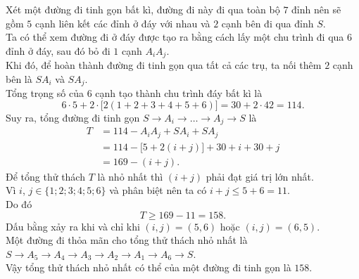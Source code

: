 \begin{ex}
{\begin{center}
		\end{center}
		Xét một đường đi tinh gọn bất kì, đường đi này đi qua toàn bộ $7$ đỉnh nên sẽ gồm $5$ cạnh liên kết các đỉnh ở đáy với nhau và $2$ cạnh bên đi qua đỉnh $S$.\\
		Ta có thể xem đường đi ở đáy được tạo ra bằng cách lấy một chu trình đi qua $6$ đỉnh ở đáy, sau đó bỏ đi $1$ cạnh $A_iA_j$.\\
		Khi đó, để hoàn thành đường đi tinh gọn qua tất cả các trụ, ta nối thêm $2$ cạnh bên là $SA_i$ và $SA_j$.\\
		Tổng trọng số của $6$ cạnh tạo thành chu trình đáy bất kì là
		\[ 6 \cdot 5 + 2 \cdot \big[2(1+2+3+4+5+6)\big] = 30 + 2 \cdot 42 = 114. \]
		Suy ra, tổng đường đi tinh gọn $S \to A_i \to \dots \to A_j \to S$ là
		\begin{align*}
			T &= 114 - A_iA_j + SA_i + SA_j \\
			&= 114 - \big[5 + 2(i+j)\big] + 30 + i + 30 + j \\
			&= 169 - (i+j).
		\end{align*}
		Để tổng thử thách $T$ là nhỏ nhất thì $(i+j)$ phải đạt giá trị lớn nhất.\\
		Vì $i$, $j \in \{1; 2; 3; 4; 5; 6\}$ và phân biệt nên ta có $i+j \le 5 + 6 = 11$.\\
		Do đó
		\[ T \ge 169 - 11 = 158. \]
		Dấu bằng xảy ra khi và chỉ khi $(i, j) = (5, 6)$ hoặc $(i, j) = (6, 5)$.\\
		Một đường đi thỏa mãn cho tổng thử thách nhỏ nhất là $S \to A_5 \to A_4 \to A_3 \to A_2 \to A_1 \to A_6 \to S$.\\
		Vậy tổng thử thách nhỏ nhất có thể của một đường đi tinh gọn là $158$.
	}
\end{ex}

